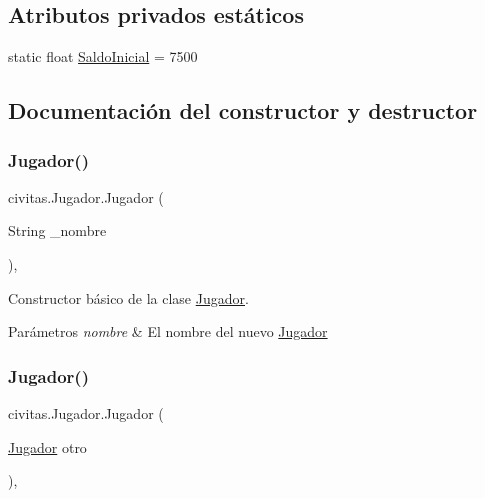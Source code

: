 \subsection*{Atributos privados estáticos}
\begin{DoxyCompactItemize}
\item 
static float \hyperlink{classcivitas_1_1Jugador_ae890734fd30e96b1fb670afa076b99dd}{Saldo\+Inicial} = 7500
\end{DoxyCompactItemize}


\subsection{Documentación del constructor y destructor}
\mbox{\label{classcivitas_1_1Jugador_a493ce0ae2a6589460ff693b7c53fbd1e}} 
\subsubsection{\texorpdfstring{Jugador()}{Jugador()}\hspace{0.1cm}{\footnotesize\ttfamily [1/2]}}
{\footnotesize\ttfamily civitas.\+Jugador.\+Jugador (\begin{DoxyParamCaption}\item[{String}]{\+\_\+nombre }\end{DoxyParamCaption})\hspace{0.3cm}{\ttfamily [inline]}, {\ttfamily [package]}}

Constructor básico de la clase \hyperlink{classcivitas_1_1Jugador}{Jugador}. 
\begin{DoxyParams}{Parámetros}
{\em nombre} & El nombre del nuevo \hyperlink{classcivitas_1_1Jugador}{Jugador} \\
\hline
\end{DoxyParams}
\mbox{\label{classcivitas_1_1Jugador_ab6d7fb12843896b100653b7ad9d9bab8}} 
\subsubsection{\texorpdfstring{Jugador()}{Jugador()}\hspace{0.1cm}{\footnotesize\ttfamily [2/2]}}
{\footnotesize\ttfamily civitas.\+Jugador.\+Jugador (\begin{DoxyParamCaption}\item[{\hyperlink{classcivitas_1_1Jugador}{Jugador}}]{otro }\end{DoxyParamCaption})\hspace{0.3cm}{\ttfamily [inline]}, {\ttfamily [protected]}}

